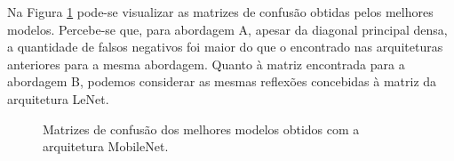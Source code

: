 Na Figura \ref{fig:matrizes-mobilenet} pode-se visualizar as matrizes de confusão obtidas pelos melhores modelos. Percebe-se que, para abordagem A, apesar da diagonal principal densa, a quantidade de falsos negativos foi maior do que o encontrado nas arquiteturas anteriores para a mesma abordagem. Quanto à matriz encontrada para a abordagem B, podemos considerar as mesmas reflexões concebidas à matriz da arquitetura LeNet.

\begin{figure}[h]
	\centering
	\caption{Matrizes de confusão dos melhores modelos obtidos com a arquitetura MobileNet.}\label{fig:matrizes-mobilenet}
	\hfill
\end{figure}
